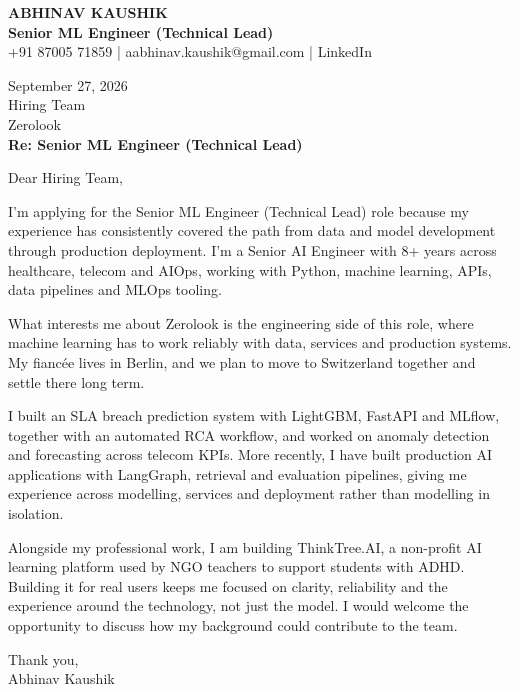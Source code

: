 \documentclass[10pt,a4paper]{article}
\begin{document}
\begin{center}
{\Large\bfseries ABHINAV KAUSHIK}\\[2pt]
{\bfseries Senior ML Engineer (Technical Lead)}\\[2pt]
+91 87005 71859 \quad | \quad aabhinav.kaushik@gmail.com \quad | \quad LinkedIn
\end{center}
\vspace{8pt}
September 27, 2026\\[6pt]
Hiring Team\\
Zerolook\\[4pt]
\textbf{Re: Senior ML Engineer (Technical Lead)}

Dear Hiring Team,

I’m applying for the Senior ML Engineer (Technical Lead) role because my experience has consistently covered the path from data and model development through production deployment. I’m a Senior AI Engineer with 8+ years across healthcare, telecom and AIOps, working with Python, machine learning, APIs, data pipelines and MLOps tooling.

What interests me about Zerolook is the engineering side of this role, where machine learning has to work reliably with data, services and production systems. My fiancée lives in Berlin, and we plan to move to Switzerland together and settle there long term.

I built an SLA breach prediction system with LightGBM, FastAPI and MLflow, together with an automated RCA workflow, and worked on anomaly detection and forecasting across telecom KPIs. More recently, I have built production AI applications with LangGraph, retrieval and evaluation pipelines, giving me experience across modelling, services and deployment rather than modelling in isolation.

Alongside my professional work, I am building ThinkTree.AI, a non-profit AI learning platform used by NGO teachers to support students with ADHD. Building it for real users keeps me focused on clarity, reliability and the experience around the technology, not just the model. I would welcome the opportunity to discuss how my background could contribute to the team.

Thank you,\\
Abhinav Kaushik
\end{document}
